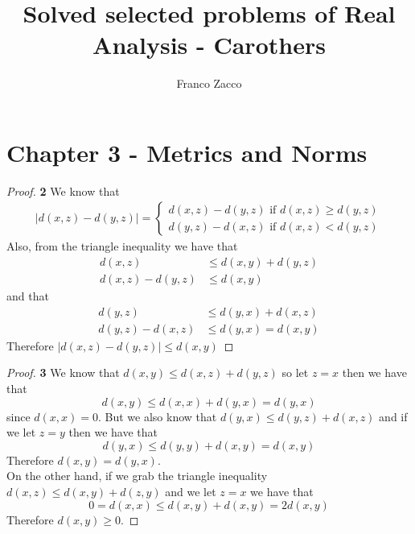\documentclass[11pt]{article}
\title{\textbf{Solved selected problems of Real Analysis - Carothers}}
\author{Franco Zacco}
\date{}
\theoremstyle{definition}
\begin{document}
\maketitle
\thispagestyle{empty}

\section*{Chapter 3 - Metrics and Norms}

	\begin{proof}{\textbf{2}}
        We know that
        \begin{align*}
            |d(x,z)-d(y,z)| =
            \begin{cases}
                d(x,z)-d(y,z) \text{ if } d(x,z) \geq d(y,z)\\ 
                d(y,z)-d(x,z) \text{ if } d(x,z) < d(y,z) 
            \end{cases}
        \end{align*}
        Also, from the triangle inequality we have that
        \begin{align*}
            d(x,z) &\leq d(x,y) + d(y,z)\\
            d(x,z) - d(y,z) &\leq d(x,y)
        \end{align*}
        and that
        \begin{align*}
            d(y,z) &\leq d(y,x) + d(x,z)\\
            d(y,z) - d(x,z) &\leq d(y,x) = d(x,y)
        \end{align*}
        Therefore $|d(x,z)-d(y,z)| \leq d(x,y)$
    \end{proof}
	\begin{proof}{\textbf{3}}
        We know that $d(x,y) \leq d(x,z) + d(y,z)$ so let $z = x$ then we have that
        $$d(x,y) \leq d(x,x) + d(y,x) = d(y,x)$$
        since $d(x,x) = 0$. But we also know that
        $d(y,x) \leq d(y,z) + d(x,z)$ and if we let $z=y$ then we have that 
        $$d(y,x) \leq d(y,y) + d(x,y) = d(x,y)$$
        Therefore $d(x,y) = d(y,x)$.\\
        On the other hand, if we grab the triangle inequality
        $d(x,z) \leq d(x,y) + d(z,y)$ and we let $z=x$ we have that
        $$0 = d(x,x) \leq d(x,y) + d(x,y) = 2 d(x,y)$$
        Therefore $d(x,y) \geq 0$.
    \end{proof}
\cleardoublepage
\end{document}
